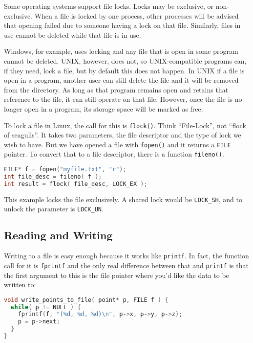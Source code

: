 Some operating systems support file locks. Locks may be exclusive, or non-exclusive. When a file is locked by one process, other processes will be advised that opening failed due to someone having a lock on that file. Similarly, files in use cannot be deleted while that file is in use.

Windows, for example, uses locking and any file that is open in some program cannot be deleted. UNIX, however, does not, so UNIX-compatible programs can, if they need, lock a file, but by default this does not happen. In UNIX if a file is open in a program, another user can still delete the file and it will be removed from the directory. As long as that program remains open and retains that reference to the file, it can still operate on that file. However, once the file is no longer open in a program, its storage space will be marked as free.

To lock a file in Linux, the call for this is \texttt{flock()}. Think ``File-Lock'', not ``flock of seagulls''. It takes two parameters, the file descriptor and the type of lock we wish to have. But we have opened a file with \texttt{fopen()} and it returns a \texttt{FILE} pointer. To convert that to a file descriptor, there is a function \texttt{fileno()}.

\begin{lstlisting}[language=C]
FILE* f = fopen("myfile.txt", "r");
int file_desc = fileno( f );
int result = flock( file_desc, LOCK_EX );
\end{lstlisting}

This example locks the file exclusively. A shared lock would be \texttt{LOCK\_SH}, and to unlock the parameter is \texttt{LOCK\_UN}.

\subsection*{Reading and Writing}

Writing to a file is easy enough because it works like \texttt{printf}. In fact, the function call for it is \texttt{fprintf} and the only real difference between that and \texttt{printf} is that the first argument to this is the file pointer where you'd like the data to be written to:

\begin{lstlisting}[language=C]
void write_points_to_file( point* p, FILE f ) {
  while( p != NULL ) {
    fprintf(f, "(%d, %d, %d)\n", p->x, p->y, p->z);
    p = p->next;
  }
}
\end{lstlisting}

